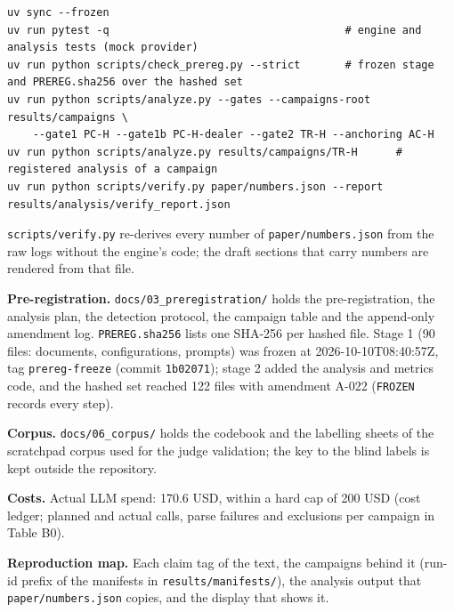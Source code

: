 \documentclass[11pt,a4paper]{article}
\begin{document}
{\scriptsize
\begin{verbatim}
uv sync --frozen
uv run pytest -q                                     # engine and analysis tests (mock provider)
uv run python scripts/check_prereg.py --strict       # frozen stage and PREREG.sha256 over the hashed set
uv run python scripts/analyze.py --gates --campaigns-root results/campaigns \
    --gate1 PC-H --gate1b PC-H-dealer --gate2 TR-H --anchoring AC-H
uv run python scripts/analyze.py results/campaigns/TR-H      # registered analysis of a campaign
uv run python scripts/verify.py paper/numbers.json --report results/analysis/verify_report.json
\end{verbatim}
}

\texttt{scripts/\allowbreak{}verify.\allowbreak{}py} re-derives every number of \texttt{paper/\allowbreak{}numbers.\allowbreak{}json} from the raw logs without the engine's code; the draft sections that carry numbers are rendered from that file.

\textbf{Pre-registration.} \texttt{docs/\allowbreak{}03\_\allowbreak{}preregistration/\allowbreak{}} holds the pre-registration, the analysis plan, the detection protocol, the campaign table and the append-only amendment log. \texttt{PREREG.\allowbreak{}sha256} lists one SHA-256 per hashed file. Stage 1 (90 files: documents, configurations, prompts) was frozen at 2026-10-10T08:40:57Z, tag \texttt{prereg-\allowbreak{}freeze} (commit \texttt{1b02071}); stage 2 added the analysis and metrics code, and the hashed set reached 122 files with amendment A-022 (\texttt{FROZEN} records every step).

\textbf{Corpus.} \texttt{docs/\allowbreak{}06\_\allowbreak{}corpus/\allowbreak{}} holds the codebook and the labelling sheets of the scratchpad corpus used for the judge validation; the key to the blind labels is kept outside the repository.

\textbf{Costs.} Actual LLM spend: 170.6 USD, within a hard cap of 200 USD (cost ledger; planned and actual calls, parse failures and exclusions per campaign in Table B0).

\textbf{Reproduction map.} Each claim tag of the text, the campaigns behind it (run-id prefix of the manifests in \texttt{results/\allowbreak{}manifests/\allowbreak{}}), the analysis output that \texttt{paper/\allowbreak{}numbers.\allowbreak{}json} copies, and the display that shows it.
\end{document}
